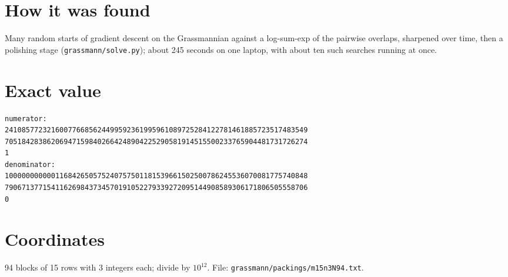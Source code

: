 \documentclass[11pt,a4paper]{article}
\begin{document}
\section{How it was found}
Many random starts of gradient descent on the Grassmannian against a log-sum-exp of the pairwise overlaps, sharpened over time, then a polishing stage (\texttt{grassmann/solve.py}); about 245 seconds on one laptop, with about ten such searches running at once.


\appendix
\section{Exact value}
{\small
\begin{verbatim}
numerator:
241085772321600776685624499592361995961089725284122781461885723517483549
705184283862069471598402664248904225290581914515500233765904481731726274
1
denominator:
100000000000116842650575240757501181539661502500786245536070081775740848
790671377154116269843734570191052279339272095144908589306171806505558706
0
\end{verbatim}}

\section{Coordinates}
94 blocks of 15 rows with 3 integers each; divide by $10^{12}$. File: \texttt{grassmann/packings/m15n3N94.txt}.
{\tiny
\begin{multicols}{3}
\end{multicols}}
\end{document}

